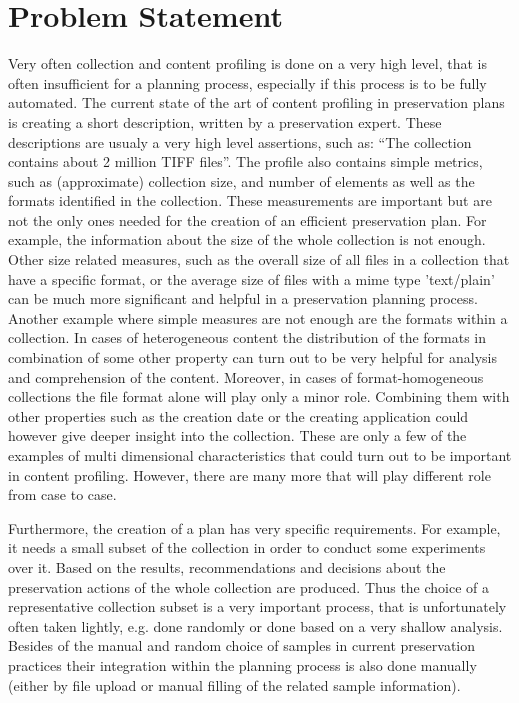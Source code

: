 \section{Problem Statement}
\label{sec:problem_statement}
Very often collection and content profiling is done on a very high level, that
is often insufficient for a planning process, especially if this process is to be fully automated.
The current state of the art of content profiling in preservation plans is creating a short description, written by a preservation expert. These descriptions are usualy a very high level assertions, such as: ``The collection contains about 2 million TIFF files''. The profile also contains simple metrics, such as (approximate) collection size, and number of elements as well as the formats identified in the collection. 
These measurements are important but are not the only ones needed for the creation of an efficient preservation plan.
For example, the information about the size of the whole collection is not enough. Other size related measures, such as the overall size of all files in a collection that have a specific format, or the average size of files with a mime type 'text/plain' can be much more significant and helpful in a preservation planning process. Another example where simple measures are not enough are the formats within a collection. In cases of heterogeneous content the distribution of the formats in combination of some other property can turn out to be very helpful for analysis and comprehension of the content. Moreover, in cases of format-homogeneous collections the file format alone will play only a minor role. Combining them with other properties such as the creation date or the creating application could however give deeper insight into the collection.
These are only a few of the examples of multi dimensional characteristics that could turn out to be important in content profiling. However, there are many more that will play different role from case to case.

Furthermore, the creation of a plan has very specific requirements. For example, it needs a small subset of the collection in order to conduct some experiments over it. Based on the results, recommendations and decisions about the preservation actions of the whole collection are produced. Thus the choice of a representative collection subset is a very important process, that is unfortunately often taken lightly, e.g. done randomly or done based on a very shallow analysis. Besides of the manual and random choice of samples in current preservation practices their integration within the planning process is also done manually (either by file upload or manual filling of the related sample information).

